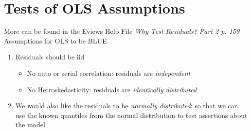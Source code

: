 \documentclass{article}\usepackage[]{graphicx}\usepackage[]{color}
\begin{document}
\section{Tests of OLS Assumptions}
More can be found in the Eviews Help File \emph{Why Test Residuals? Part 2 p. 159}
Assumptions for OLS to be BLUE
\begin{enumerate}
\item Residuals should be iid
\begin{itemize}
\item No auto or serial correlation: residuals are \emph{independent}
\item No Hetroskedasticity: residuals are \emph{identically distributed}
\end{itemize}
\item We would also like the residuals to be \emph{normally distributed}: so that we can use the known quantiles from the normal distribution to test assertions about the model
\end{enumerate}


%
%
\end{document}
